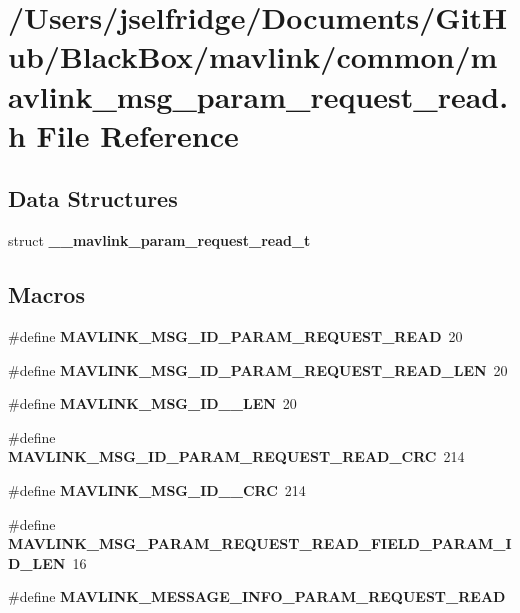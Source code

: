 \section{/\+Users/jselfridge/\+Documents/\+Git\+Hub/\+Black\+Box/mavlink/common/mavlink\+\_\+msg\+\_\+param\+\_\+request\+\_\+read.h File Reference}
\label{mavlink__msg__param__request__read_8h}
\subsection*{Data Structures}
\begin{DoxyCompactItemize}
\item 
struct \textbf{ \+\_\+\+\_\+mavlink\+\_\+param\+\_\+request\+\_\+read\+\_\+t}
\end{DoxyCompactItemize}
\subsection*{Macros}
\begin{DoxyCompactItemize}
\item 
\#define \textbf{ M\+A\+V\+L\+I\+N\+K\+\_\+\+M\+S\+G\+\_\+\+I\+D\+\_\+\+P\+A\+R\+A\+M\+\_\+\+R\+E\+Q\+U\+E\+S\+T\+\_\+\+R\+E\+AD}~20
\item 
\#define \textbf{ M\+A\+V\+L\+I\+N\+K\+\_\+\+M\+S\+G\+\_\+\+I\+D\+\_\+\+P\+A\+R\+A\+M\+\_\+\+R\+E\+Q\+U\+E\+S\+T\+\_\+\+R\+E\+A\+D\+\_\+\+L\+EN}~20
\item 
\#define \textbf{ M\+A\+V\+L\+I\+N\+K\+\_\+\+M\+S\+G\+\_\+\+I\+D\+\_\+\_\+\+L\+EN}~20
\item 
\#define \textbf{ M\+A\+V\+L\+I\+N\+K\+\_\+\+M\+S\+G\+\_\+\+I\+D\+\_\+\+P\+A\+R\+A\+M\+\_\+\+R\+E\+Q\+U\+E\+S\+T\+\_\+\+R\+E\+A\+D\+\_\+\+C\+RC}~214
\item 
\#define \textbf{ M\+A\+V\+L\+I\+N\+K\+\_\+\+M\+S\+G\+\_\+\+I\+D\+\_\+\_\+\+C\+RC}~214
\item 
\#define \textbf{ M\+A\+V\+L\+I\+N\+K\+\_\+\+M\+S\+G\+\_\+\+P\+A\+R\+A\+M\+\_\+\+R\+E\+Q\+U\+E\+S\+T\+\_\+\+R\+E\+A\+D\+\_\+\+F\+I\+E\+L\+D\+\_\+\+P\+A\+R\+A\+M\+\_\+\+I\+D\+\_\+\+L\+EN}~16
\item 
\#define \textbf{ M\+A\+V\+L\+I\+N\+K\+\_\+\+M\+E\+S\+S\+A\+G\+E\+\_\+\+I\+N\+F\+O\+\_\+\+P\+A\+R\+A\+M\+\_\+\+R\+E\+Q\+U\+E\+S\+T\+\_\+\+R\+E\+AD}
\end{DoxyCompactItemize}
